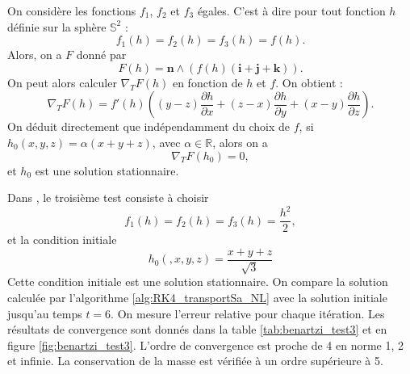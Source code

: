 On considère les fonctions $f_1$, $f_2$ et $f_3$ égales. C'est à dire pour tout fonction $h$ définie sur la sphère $\mathbb{S}^2$ :
\begin{equation}
f_1(h) = f_2(h) = f_3(h) = f(h).
\end{equation}
Alors, on a $F$ donné par
\begin{equation}
F(h) = \mathbf{n} \wedge \left( f(h) (\mathbf{i}+\mathbf{j}+\mathbf{k}) \right).
\end{equation}
On peut alors calculer $\nabla_T F(h)$ en fonction de $h$ et $f$. On obtient :
\begin{equation}
\nabla_T F(h) = f'(h) \left( (y-z)\dfrac{\partial h}{\partial x} + (z-x)\dfrac{\partial h}{\partial y} + (x-y)\dfrac{\partial h}{\partial z} \right).
\end{equation}
On déduit directement que indépendamment du choix de $f$, si $h_0(x,y,z) = \alpha (x+y+z)$, avec $\alpha \in \mathbb{R}$, alors on a
\begin{equation}
\nabla_T F(h_0) = 0,
\end{equation}
et $h_0$ est une solution stationnaire.

Dans \cite{BenArtzi2009}, le troisième test consiste à choisir
\begin{equation}
f_1(h) = f_2(h) = f_3(h) = \dfrac{h^2}{2},
\end{equation}
et la condition initiale 
\begin{equation}
h_0(,x,y,z) = \dfrac{x+y+z}{\sqrt{3}}
\end{equation}
Cette condition initiale est une solution stationnaire. On compare la solution calculée par l'algorithme \ref{alg:RK4_transportSa_NL} avec la solution initiale jusqu'au temps $t=6$. On mesure l'erreur relative pour chaque itération. Les résultats de convergence sont donnés dans la table \ref{tab:benartzi_test3} et en figure \ref{fig:benartzi_test3}. L'ordre de convergence est proche de 4 en norme 1, 2 et infinie. La conservation de la masse est vérifiée à un ordre supérieure à 5.

